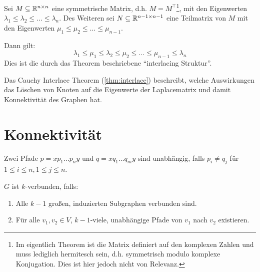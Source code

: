 \begin{theorem}
    \label{thm:interlace}
    Sei $ M \subseteq \mathbb{R}^{n \times n} $ eine symmetrische Matrix, d.h. $ M = M^\top $\footnote{%
        Im eigentlich Theorem ist die Matrix definiert auf den komplexen Zahlen und muss lediglich hermitesch sein, d.h. symmetrisch modulo komplexe Konjugation.
        Dies ist hier jedoch nicht von Relevanz.
    }, mit den Eigenwerten $ \lambda_1 \leq \lambda_2 \leq \dots \leq \lambda_n $.
    Des Weiteren sei $ N \subseteq \mathbb{R}^{n - 1 \times n - 1} $ eine Teilmatrix von $ M $ mit den Eigenwerten $ \mu_1 \leq \mu_2 \leq \dots \leq \mu_{n - 1} $.

    Dann gilt:
    \begin{equation*}
        \lambda_1 \leq \mu_1 \leq \lambda_2 \leq \mu_2 \leq \dots \leq \mu_{n - 1} \leq \lambda_n
    \end{equation*}
    Dies ist die durch das Theorem beschriebene ``interlacing Struktur''.
\end{theorem}

\begin{observation}
    Das Cauchy Interlace Theorem (\ref{thm:interlace}) beschreibt, welche Auswirkungen das Löschen von Knoten auf die Eigenwerte der Laplacematrix und damit Konnektivität des Graphen hat.
\end{observation}

\section{Konnektivität}

\begin{definition}
    Zwei Pfade $ p = x p_1 \dots p_n y $ und $ q = x q_1 \dots q_m y $ sind unabhängig, falls $ p_i \neq q_j $ für $ 1 \leq i \leq n, 1 \leq j \leq n $.
\end{definition}

\begin{proposition}
    \label{prp:char-k-connected}
    $ G $ ist $ k $-verbunden, falls:
    \begin{enumerate}
        \item Alle $ k - 1 $ großen, induzierten Subgraphen verbunden sind.
        \item Für alle $ v_1, v_2 \in V $, $ k - 1 $-viele, unabhängige Pfade von $ v_1 $ nach $ v_2 $ existieren.
    \end{enumerate}
\end{proposition}

